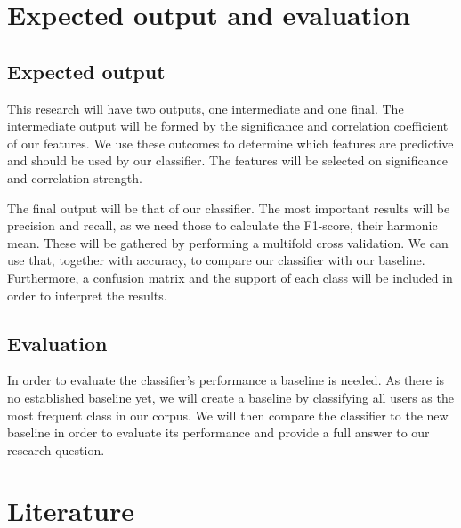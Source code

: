 \documentclass[11pt, a4paper]{article}
\begin{document}
\section{Expected output and evaluation}
\subsection{Expected output}
This research will have two outputs, one intermediate and one final. The intermediate output will be formed by the significance and correlation coefficient of our features. We use these outcomes to determine which features are predictive and should be used by our classifier. The features will be selected on significance and correlation strength. 

The final output will be that of our classifier. The most important results will be precision and recall, as we need those to calculate the F1-score, their harmonic mean. These will be gathered by performing a multifold cross validation. We can use that, together with accuracy, to compare our classifier with our baseline. Furthermore, a confusion matrix and the support of each class will be included in order to interpret the results. 

\subsection{Evaluation}
In order to evaluate the classifier's performance a baseline is needed. As there is no established baseline yet, we will create a baseline by classifying all users as the most frequent class in our corpus. We will then compare the classifier to the new baseline in order to evaluate its performance and provide a full answer to our research question.

\section{Literature}

\end{document}
